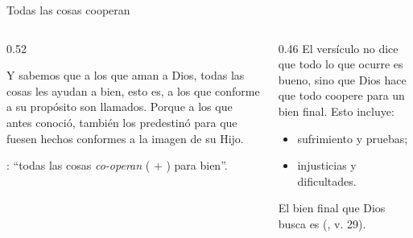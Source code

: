 \begin{frame}{Todas las cosas cooperan}
\begin{columns}[t,onlytextwidth]
\begin{column}{0.52\textwidth}
\begin{cita}Y sabemos que a los que aman a Dios, todas las cosas les ayudan a bien, esto es, a los que conforme a su propósito son llamados. Porque a los que antes conoció, también los predestinó para que fuesen hechos conformes a la imagen de su Hijo.\end{cita}
\scriptsize{}: ``todas las cosas \emph{co-operan} ( + ) para bien''.
\end{column}
\begin{column}{0.46\textwidth}\small
El versículo no dice que todo lo que ocurre es bueno, sino que Dios hace que todo coopere para un bien final. Esto incluye:
\begin{itemize}
\item sufrimiento y pruebas;
\item injusticias y dificultades.
\end{itemize}
El bien final que Dios busca es  (, v. 29).
\end{column}
\end{columns}
\end{frame}

